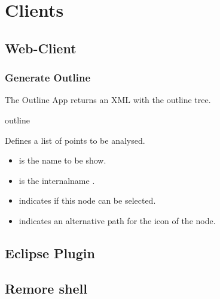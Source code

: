 {%
}

\chapter{\ei Clients}
\label{ch:clients}


\section{Web-Client}
\label{ch:clients:web}


\subsection{Generate Outline}
\label{ch:clients:web:outline}

The Outline App returns an XML with the outline tree.

\bigskip
\xmlstruct
{outline}
{
%
  Defines a list of points to be analysed.
\begin{itemize}
  \item {} is the name to be show.
   \item {} is the internalname .
\item {} indicates if this node can be
  selected.
\item {} indicates an alternative path for the icon
  of the node.

\end{itemize}
%
}
{}




\section{Eclipse Plugin}
\label{ch:clients:eclipse}

\section{Remore shell}
\label{ch:clients:shell}
